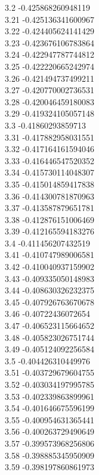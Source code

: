 {3.2	-0.425868260948119\\
3.21	-0.425136341600967\\
3.22	-0.424405624141429\\
3.23	-0.423676106783864\\
3.24	-0.422947787744812\\
3.25	-0.422220665242974\\
3.26	-0.421494737499211\\
3.27	-0.420770002736531\\
3.28	-0.420046459180083\\
3.29	-0.419324105057148\\
3.3	-0.41860293859713\\
3.31	-0.417882958031551\\
3.32	-0.417164161594046\\
3.33	-0.416446547520352\\
3.34	-0.415730114048307\\
3.35	-0.415014859417838\\
3.36	-0.414300781870963\\
3.37	-0.413587879651781\\
3.38	-0.412876151006469\\
3.39	-0.412165594183276\\
3.4	-0.411456207432519\\
3.41	-0.410747989006581\\
3.42	-0.410040937159902\\
3.43	-0.409335050148983\\
3.44	-0.408630326232375\\
3.45	-0.407926763670678\\
3.46	-0.40722436072654\\
3.47	-0.406523115664652\\
3.48	-0.405823026751744\\
3.49	-0.405124092256584\\
3.5	-0.404426310449976\\
3.51	-0.403729679604755\\
3.52	-0.403034197995785\\
3.53	-0.402339863899961\\
3.54	-0.401646675596199\\
3.55	-0.400954631365441\\
3.56	-0.400263729490649\\
3.57	-0.399573968256806\\
3.58	-0.398885345950909\\
3.59	-0.398197860861973\\
}
